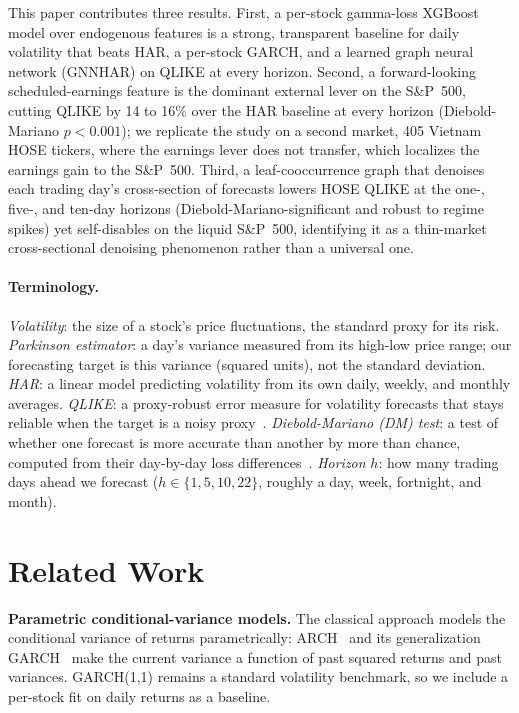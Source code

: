 \documentclass[runningheads]{llncs}
\begin{document}
This paper contributes three results. First, a per-stock gamma-loss XGBoost model over endogenous
features is a strong, transparent baseline for daily volatility that beats HAR, a per-stock
GARCH, and a learned graph neural network (GNNHAR) on QLIKE at every horizon. Second, a forward-looking
scheduled-earnings feature is the dominant external lever on the S\&P~500, cutting QLIKE by 14 to
16\% over the HAR baseline at every horizon (Diebold-Mariano $p<0.001$); we replicate the study on a
second market, 405 Vietnam HOSE tickers, where the earnings lever does not transfer, which localizes
the earnings gain to the S\&P~500. Third, a leaf-cooccurrence graph that denoises each trading day's
cross-section of forecasts lowers HOSE QLIKE at the one-, five-, and ten-day horizons
(Diebold-Mariano-significant and robust to regime spikes) yet self-disables on the liquid S\&P~500,
identifying it as a thin-market cross-sectional denoising phenomenon rather than a universal one.

\paragraph{Terminology.}
\emph{Volatility}: the size of a stock's price fluctuations, the standard proxy for its risk.
\emph{Parkinson estimator}: a day's variance measured from its high-low price range; our forecasting
target is this variance (squared units), not the standard deviation.
\emph{HAR}: a linear model predicting volatility from its own daily, weekly, and monthly averages.
\emph{QLIKE}: a proxy-robust error measure for volatility forecasts that stays reliable when the
target is a noisy proxy~\cite{patton2011}.
\emph{Diebold-Mariano (DM) test}: a test of whether one forecast is more accurate than another by
more than chance, computed from their day-by-day loss differences~\cite{dm1995}.
\emph{Horizon} $h$: how many trading days ahead we forecast ($h\in\{1,5,10,22\}$, roughly a day, week,
fortnight, and month).

\section{Related Work}
\textbf{Parametric conditional-variance models.} The classical approach models the conditional variance of
returns parametrically: ARCH~\cite{engle1982} and its generalization GARCH~\cite{bollerslev1986} make the
current variance a function of past squared returns and past variances. GARCH(1,1) remains a standard
volatility benchmark, so we include a per-stock fit on daily returns as a baseline.
\end{document}
